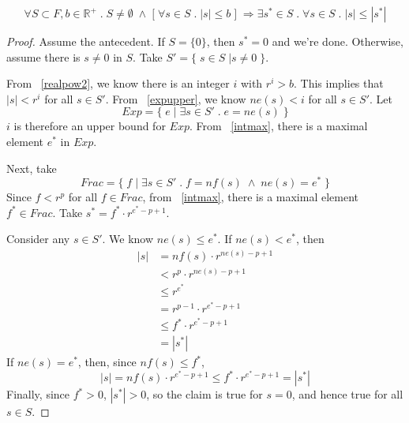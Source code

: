 \documentclass{article}
\begin{document}
\begin{thm}
\label{maxabsexists}
\begin{equation*}
\forall S \subset F, b \in \mathbb{R}^+ \; . \; S \neq \emptyset \; \wedge \;
\big [ \; \forall s \in S \; . \; |s| \leq b \; \big ] \;
\Longrightarrow \exists s^* \in S \; . \; \forall s \in S \; . \; |s| \leq |s^*|
\end{equation*}
\begin{proof} Assume the antecedent. If $S = \{0\}$, then $s^* = 0$ and we're
done. Otherwise, assume there is $s \neq 0$ in $S$. Take $S' = \{ \; s \in S \;
| s \neq 0 \; \}$.

From ~\ref{realpow2}, we know there is an integer $i$ with $r^i > b$. 
This implies that $|s| < r^i$ for all $s \in S'$. From ~\ref{expupper}, we
know $ne(s) < i$ for all $s \in S'$. Let
\begin{equation*}
Exp = \{ \; e \; | \; \exists s \in S' \; . \; e = ne(s) \; \}
\end{equation*}
$i$ is therefore an upper bound for $Exp$. From ~\ref{intmax}, there is a
maximal element $e^*$ in $Exp$.

Next, take
\begin{equation*}
Frac = \{ \; f \; | \; \exists s \in S' \; . \; f = nf(s) \; \wedge \;
ne(s) = e^* \; \}
\end{equation*}
Since $f < r^p$ for all $f \in Frac$, from ~\ref{intmax}, there is a maximal
element $f^* \in Frac$. Take $s^* = f^* \cdot r^{e^* - p + 1}$.

Consider any $s \in S'$. We know $ne(s) \leq e^*$. If $ne(s) < e^*$, then
\begin{align*}
|s| &= nf(s) \cdot r^{ne(s) - p + 1}\\
& < r^p \cdot r^{ne(s) - p + 1}\\
&\leq r^{e^*}\\
& = r^{p - 1} \cdot r^{e^* - p + 1}\\
& \leq f^* \cdot r^{e^* - p + 1}\\
& = |s^*|
\end{align*}
If $ne(s) = e^*$, then, since $nf(s) \leq f^*$,
\begin{equation*}
|s| = nf(s) \cdot r^{e^* - p + 1} \leq f^* \cdot r^{e^* - p + 1} = |s^*|
\end{equation*}
Finally, since $f^* > 0$, $|s^*| > 0$, so the claim is true for $s = 0$, and
hence true for all $s \in S$.
\end{proof}
\end{thm}
\end{document}
